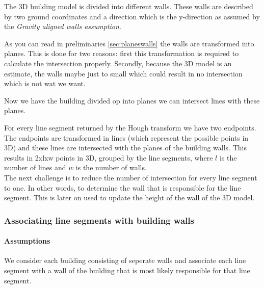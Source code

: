 	 The 3D building model is divided into different walls. These walls are
	 described by two ground coordinates and a direction which is the y-direction as
	 assumed by the \emph{Gravity aligned walls assumption}.

	As you can read in preliminaries \ref{sec:planeswalls} the walls are transformed
	into planes.  This is done for two reasons: first this transformation is required to calculate the intersection properly.
	Secondly, because the 3D model is an estimate, the walls maybe just
	to small which could %
	result in no intersection which is not wat we want.

	Now we have the building divided op into planes we can intersect lines with
	these planes.

	For every line segment returned by the Hough transform we have two
	endpoints. The endpoints are transformed in lines (which represent the
	possible points in 3D) and these lines are
	intersected with the planes of the building walls.
	This results in 2xlxw points in 3D, grouped by the line segments, where $l$ is the number
	of lines and $w$ is the number of walls.\\

	The next challenge is to reduce the number of intersection for every line
	segment to one. In other words, to determine the wall that is responsible for
	the line segment. This is later on used to update the height of the wall of the
	3D model.\\


\subsubsection{Associating line segments with building walls}
\label{sec:lwa}
	\paragraph{Assumptions}
	We consider each building consisting of seperate walls and associate each
	line segment with a wall of the building that is most likely responsible for
	that line segment. \\
		
